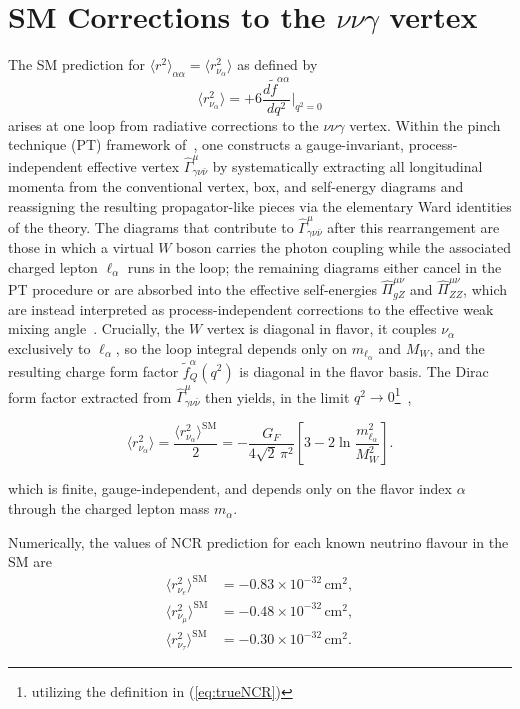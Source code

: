\section{SM Corrections to the $\nu \nu \gamma$ vertex}
The SM prediction for $\langle r^2 \rangle_{\alpha\alpha} = \langle r^2_{\nu_\alpha} \rangle$ as defined by
\begin{equation} 
	\langle r^2 _{\nu_\alpha}\rangle = +6\frac{d\widetilde f^{\alpha\alpha}}{dq^2}\Big|_{q^2=0}
\end{equation} 
arises at one loop from radiative corrections to the $\nu\nu\gamma$ vertex. Within the pinch technique (PT) framework of~\cite{Bernabeu_2000}, one constructs a gauge-invariant, process-independent effective vertex $\hat{\Gamma}^\mu_{\gamma\nu\bar{\nu}}$ by systematically extracting all longitudinal momenta from the conventional vertex, box, and self-energy diagrams and reassigning the resulting propagator-like pieces via the elementary Ward identities of the theory. The diagrams that contribute to $\hat{\Gamma}^\mu_{\gamma\nu\bar{\nu}}$ after this rearrangement are those in which a virtual $W$ boson carries the photon coupling while the associated charged lepton $\ell_\alpha$ runs in the loop; the remaining diagrams either cancel in the PT procedure or are absorbed into the effective self-energies $\hat{\Pi}^{\mu\nu}_{gZ}$ and $\hat{\Pi}^{\mu\nu}_{ZZ}$, which are instead interpreted as process-independent corrections to the effective weak mixing angle~\cite{Bernabeu_2000}. Crucially, the $W$ vertex is diagonal in flavor, it couples $\nu_\alpha$ exclusively to $\ell_\alpha$, so the loop integral depends only on $m_{\ell_\alpha}$ and $M_W$, and the resulting charge form factor $\widetilde{f}^\alpha_Q(q^2)$ is diagonal in the flavor basis. The Dirac form factor extracted from $\hat{\Gamma}^\mu_{\gamma\nu\bar{\nu}}$ then yields, in the limit $q^2\to 0$\footnote{utilizing the definition in (\ref{eq:trueNCR})}~\cite{Bernabeu_2000},

\begin{equation}
\langle r^2_{\nu_\alpha} \rangle = \frac{\langle r^2_{\nu_\alpha} \rangle^\text{SM}}{2}
= -\frac{G_F}{4\sqrt{2}\,\pi^2}
\left[3 - 2\ln\frac{m_{\ell_\alpha}^2}{M_W^2}\right].
\label{eq:NCR_SM}
\end{equation}

\noindent which is finite, gauge-independent, and depends only on the flavor index $\alpha$ through the charged lepton mass $m_{\alpha}$. 

Numerically, the values of NCR prediction for each known neutrino flavour in the SM are\begin{align}
	\langle r^2_{\nu_e} \rangle^\text{SM} &= -0.83 \times 10^{-32}\,\text{cm}^2,\\
	\langle r^2_{\nu_\mu} \rangle ^\text{SM}&= -0.48 \times 10^{-32}\,\text{cm}^2,\\
	\langle r^2_{\nu_\tau} \rangle^\text{SM} &= -0.30 \times 10^{-32}\,\text{cm}^2.
\end{align}

